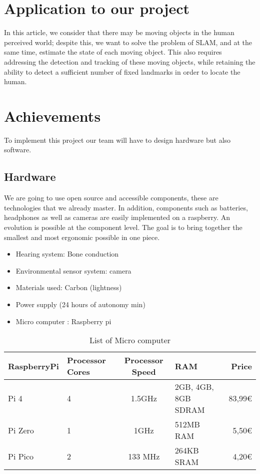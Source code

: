 \documentclass[conference,compsoc]{IEEEtran}
\begin{document}
\section{Application to our project}
In this article, we consider that there may be moving objects in the human perceived world; despite this, we want to solve the problem of SLAM, and at the same time, estimate the state of each moving object. This also requires addressing the detection and tracking of these moving objects, while retaining the ability to detect a sufficient number of fixed landmarks in order to locate the human.

\section{Achievements}
To implement this project our team will have to design hardware but also software.

\subsection{Hardware}

We are going to use open source and accessible components, these are technologies that we already master. In addition, components such as batteries, headphones as well as cameras are easily implemented on a raspberry. An evolution is possible at the component level. The goal is to bring together the smallest and most ergonomic possible in one piece.

\begin{itemize}
  \item Hearing system: Bone conduction
  \item Environmental sensor system: camera
  \item Materials used: Carbon (lightness)
  \item Power supply (24 hours of autonomy min)
  \item Micro computer : Raspberry pi
\end{itemize}

\begin{table}[h]
\center
\begin{tabular}{|l|m{1cm}|c|m{1.7cm}|r|}
  \hline
  RaspberryPi&Processor Cores&Processor Speed & RAM & Price\\
  \hline
  Pi 4 & 4 & 1.5GHz &2GB, 4GB, 8GB SDRAM&83,99€\\
  Pi Zero & 1 & 1GHz &512MB RAM&5,50€\\
  Pi Pico & 2 & 133 MHz& 264KB SRAM&4,20€\\
  \hline
\end{tabular}
\caption{List of Micro computer}
\label{tab:listOfMicroComputer}
\end{table}
\end{document}
